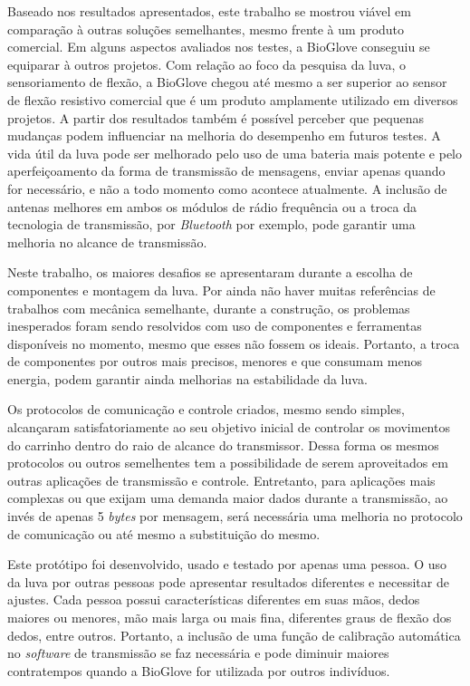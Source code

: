 \documentclass[
	12pt,				%
	openright,			%
	oneside,			%
	a4paper,			%
	english,			%
	brazil				%
	]{abntex2}
\begin{document}
		Baseado nos resultados apresentados, este trabalho se mostrou viável em comparação à outras soluções semelhantes, mesmo frente à um produto comercial. Em alguns aspectos avaliados nos testes, a BioGlove conseguiu se equiparar à outros projetos. Com relação ao foco da pesquisa da luva, o sensoriamento de flexão, a BioGlove chegou até mesmo a ser superior ao sensor de flexão resistivo comercial que é um produto amplamente utilizado em diversos projetos. A partir dos resultados também é possível perceber que pequenas mudanças podem influenciar na melhoria do desempenho em futuros testes. A vida útil da luva pode ser melhorado pelo uso de uma bateria mais potente e pelo aperfeiçoamento da forma de transmissão de mensagens, enviar apenas quando for necessário, e não a todo momento como acontece atualmente. A inclusão de antenas melhores em ambos os módulos de rádio frequência ou a troca da tecnologia de transmissão, por \textit{Bluetooth} por exemplo, pode garantir uma melhoria no alcance de transmissão.

		Neste trabalho, os maiores desafios se apresentaram durante a escolha de componentes e montagem da luva. Por ainda não haver muitas referências de trabalhos com mecânica semelhante, durante a construção, os problemas inesperados foram sendo resolvidos com uso de componentes e ferramentas disponíveis no momento, mesmo que esses não fossem os ideais. Portanto, a troca de componentes por outros mais precisos, menores e que consumam menos energia, podem garantir ainda melhorias na estabilidade da luva.

		Os protocolos de comunicação e controle criados, mesmo sendo simples, alcançaram satisfatoriamente ao seu objetivo inicial de controlar os movimentos do carrinho dentro do raio de alcance do transmissor. Dessa forma os mesmos protocolos ou outros semelhentes tem a possibilidade de serem aproveitados em outras aplicações de transmissão e controle. Entretanto, para aplicações mais complexas ou que exijam uma demanda maior dados durante a transmissão, ao invés de apenas 5 \textit{bytes} por mensagem, será necessária uma melhoria no protocolo de comunicação ou até mesmo a substituição do mesmo.

		Este protótipo foi desenvolvido, usado e testado por apenas uma pessoa. O uso da luva por outras pessoas pode apresentar resultados diferentes e necessitar de ajustes. Cada pessoa possui características diferentes em suas mãos, dedos maiores ou menores, mão mais larga ou mais fina, diferentes graus de flexão dos dedos, entre outros. Portanto, a inclusão de uma função de calibração automática no \textit{software} de transmissão se faz necessária e pode diminuir maiores contratempos quando a BioGlove for utilizada por outros indivíduos.
\end{document}

